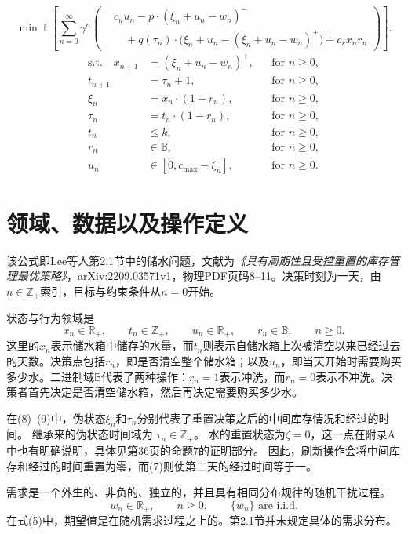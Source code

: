 \documentclass{article}
\begin{document}
\begin{equation}
\min\;\mathbb{E}\!\left[\sum_{n=0}^{\infty}\gamma^n\left(
\begin{aligned}
&c_u u_n-p\cdot(\xi_n+u_n-w_n)^-\\
&\quad+q(\tau_n)\cdot\bigl(\xi_n+u_n-(\xi_n+u_n-w_n)^+\bigr)
+c_r x_n r_n
\end{aligned}
\right)\right].
\tag{5}
\end{equation}
\begin{align}
\text{s.t.}\quad x_{n+1}&=(\xi_n+u_n-w_n)^+,
&&\text{for }n\geq0,\tag{6}\\
t_{n+1}&=\tau_n+1,
&&\text{for }n\geq0,\tag{7}\\
\xi_n&=x_n\cdot(1-r_n),
&&\text{for }n\geq0,\tag{8}\\
\tau_n&=t_n\cdot(1-r_n),
&&\text{for }n\geq0,\tag{9}\\
t_n&\leq k,
&&\text{for }n\geq0,\tag{10}\\
r_n&\in\mathbb{B},
&&\text{for }n\geq0,\tag{11}\\
u_n&\in[0,c_{\max}-\xi_n],
&&\text{for }n\geq0.\tag{12}
\end{align}

\section*{领域、数据以及操作定义}
该公式即Lee等人第2.1节中的储水问题，文献为\emph{《具有周期性且受控重置的库存管理最优策略》}，arXiv:2209.03571v1，物理PDF页码8--11。决策时刻为一天，由$n\in\mathbb{Z}_+$索引，目标与约束条件从$n=0$开始。

状态与行为领域是
\[
x_n\in\mathbb{R}_+,\qquad t_n\in\mathbb{Z}_+,\qquad
u_n\in\mathbb{R}_+,\qquad r_n\in\mathbb{B},
\qquad n\geq0.
\]
这里的$x_n$表示储水箱中储存的水量，而$t_n$则表示自储水箱上次被清空以来已经过去的天数。决策点包括$r_n$，即是否清空整个储水箱；以及$u_n$，即当天开始时需要购买多少水。二进制域$\mathbb{B}$代表了两种操作：$r_n=1$表示冲洗，而$r_n=0$表示不冲洗。决策者首先决定是否清空储水箱，然后再决定需要购买多少水。

在(8)--(9)中，伪状态$\xi_n$和$\tau_n$分别代表了重置决策之后的中间库存情况和经过的时间。 继承来的伪状态时间域为 $\tau_n\in\mathbb{Z}_+$。 水的重置状态为$\zeta=0$，这一点在附录A中也有明确说明，具体见第36页的命题7的证明部分。 因此，刷新操作会将中间库存和经过的时间重置为零，而(7)则使第二天的经过时间等于一。

需求是一个外生的、非负的、独立的，并且具有相同分布规律的随机干扰过程。
\[
w_n\in\mathbb{R}_+,\qquad n\geq0,\qquad
\{w_n\}\text{ are i.i.d.}
\]
在式(5)中，期望值是在随机需求过程之上的。第2.1节并未规定具体的需求分布。
\end{document}
